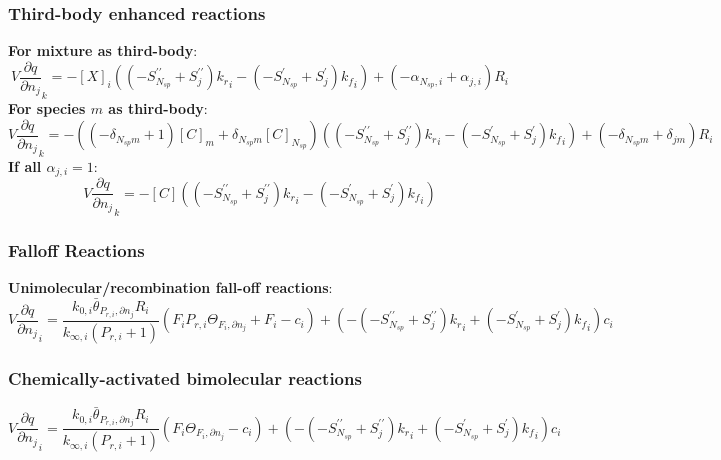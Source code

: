 \documentclass[a4paper,10pt]{article}
\newcommand{\ns}{N_{sp}}
\begin{document}
\subsubsection{Third-body enhanced reactions}
\textbf{For mixture as third-body}:
\begin{dmath} V \frac{\partial q }{\partial {n_j} }_{k} = - [X]_{i} \left(\left(- S^{\prime\prime}_{\ns} + S^{\prime\prime}_{j}\right) {k_r}_{i} - \left(- S^{\prime}_{\ns} + S^{\prime}_{j}\right) {k_f}_{i}\right) + \left(- \alpha_{\ns,i} + \alpha_{j,i}\right) R_{i}\end{dmath} 
\textbf{For species $m$ as third-body}:
\begin{dmath} V \frac{\partial q }{\partial {n_j} }_{k} = - \left(\left(- \delta_{\ns m} + 1\right) [C]_{m} + \delta_{\ns m} [C]_{\ns}\right) \left(\left(- S^{\prime\prime}_{\ns} + S^{\prime\prime}_{j}\right) {k_r}_{i} - \left(- S^{\prime}_{\ns} + S^{\prime}_{j}\right) {k_f}_{i}\right) + \left(- \delta_{\ns m} + \delta_{j m}\right) R_{i}\end{dmath} 
\textbf{If all $\alpha_{j,i} = 1$}:
\begin{dmath} V \frac{\partial q }{\partial {n_j} }_{k} = - [C] \left(\left(- S^{\prime\prime}_{\ns} + S^{\prime\prime}_{j}\right) {k_r}_{i} - \left(- S^{\prime}_{\ns} + S^{\prime}_{j}\right) {k_f}_{i}\right)\end{dmath} 
\subsubsection{Falloff Reactions}
\textbf{Unimolecular\slash recombination fall-off reactions}:
\begin{dmath} V \frac{\partial q }{\partial {n_j} }_{i} = \frac{k_{0, i} \bar{\theta}_{P_{r, i}, \partial n_j} R_{i}}{k_{\infty, i} \left(P_{r, i} + 1\right)} \left(F_{i} P_{r, i} \Theta_{F_i, \partial n_j} + F_{i} - c_{i}\right) + \left(- \left(- S^{\prime\prime}_{\ns} + S^{\prime\prime}_{j}\right) {k_r}_{i} + \left(- S^{\prime}_{\ns} + S^{\prime}_{j}\right) {k_f}_{i}\right) c_{i}\end{dmath} 
\subsubsection{Chemically-activated bimolecular reactions}
\begin{dmath} V \frac{\partial q }{\partial {n_j} }_{i} = \frac{k_{0, i} \bar{\theta}_{P_{r, i}, \partial n_j} R_{i}}{k_{\infty, i} \left(P_{r, i} + 1\right)} \left(F_{i} \Theta_{F_i, \partial n_j} - c_{i}\right) + \left(- \left(- S^{\prime\prime}_{\ns} + S^{\prime\prime}_{j}\right) {k_r}_{i} + \left(- S^{\prime}_{\ns} + S^{\prime}_{j}\right) {k_f}_{i}\right) c_{i}\end{dmath} 
\end{document}
